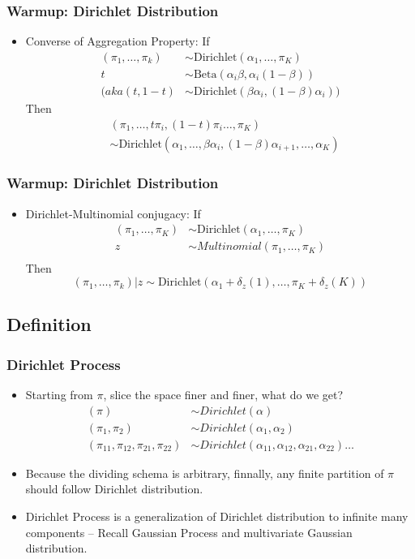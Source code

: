 \documentclass{beamer}
\begin{document}
\begin{frame}
	\frametitle{Warmup: Dirichlet Distribution}
	\begin{itemize}
		\item {Converse of Aggregation Property:}	If 
		\begin{align*}
		(\pi_1,\dots, \pi_k) & \sim \text{Dirichlet}(\alpha_1, \ldots, \pi_K) \\
		t & \sim \text{Beta}(\alpha_i \beta, \alpha_i (1-\beta)) \\
		(aka (t, 1-t) &\sim \text{Dirichlet}(\beta\alpha_i , (1-\beta)\alpha_i ))
		\end{align*}
		Then
		\begin{align*}
		& (\pi_1,\ldots,t\pi_i,(1-t)\pi_i\ldots, \pi_K) \\
		& \sim \text{Dirichlet}(\alpha_1,\ldots,\beta\alpha_i, (1-\beta)\alpha_{i+1}, \ldots, \alpha_K) 
		\end{align*}
	\end{itemize}
\end{frame}
\begin{frame}
	\frametitle{Warmup: Dirichlet Distribution}
	\begin{itemize}
		\item {Dirichlet-Multinomial conjugacy:}	If 
		\begin{align*}
		(\pi_1,\dots, \pi_K) & \sim \text{Dirichlet}(\alpha_1, \ldots, \pi_K) \\
		z & \sim Multinomial(\pi_1,\dots, \pi_K) \\
		\end{align*}
		Then
		\[
		(\pi_1,\dots, \pi_k)|z \sim \text{Dirichlet}(\alpha_1+\delta_z(1), \ldots, \pi_K+\delta_z(K))
		\]
	\end{itemize}
\end{frame}

\subsection{Definition}
\begin{frame}
	\frametitle{Dirichlet Process}
	\begin{itemize}
		\item Starting from $\pi$, slice the space finer and finer, what do we get?
		\begin{align*}
			(\pi) & \sim Dirichlet(\alpha) \\
			(\pi_1, \pi_2) & \sim Dirichlet(\alpha_1, \alpha_2) \\
			(\pi_{11},\pi_{12}, \pi_{21}, \pi_{22}) & \sim Dirichlet(\alpha_{11},\alpha_{12}, \alpha_{21},\alpha_{22}) \ldots 
		\end{align*}
		\item Because the dividing schema is arbitrary, finnally, any finite partition of $\pi$ should follow Dirichlet distribution.
		\pause
		\item Dirichlet Process is a generalization of Dirichlet distribution to infinite many components -- Recall Gaussian Process and multivariate Gaussian distribution.
	
	\end{itemize}
\end{frame}
\end{document}
